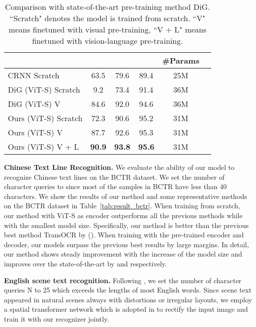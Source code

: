 \begin{table}[!t]
    \caption{Comparison with state-of-the-art pre-training method DiG. “Scratch"  denotes the model is trained from scratch. “V" means finetuned with visual pre-training, “V + L" means finetuned with vision-language pre-training.}
    \label{tab:eng_real}
    \setlength{\tabcolsep}{6pt}
    \centering
    \begin{tabular}{lccccc}
    \toprule
    & & & &\#Params \\
    \midrule
    CRNN Scratch &63.5 &79.6 &89.4 &25M \\ 
    \midrule
    DiG (ViT-S) Scratch  &9.2 &73.4 &91.4 &36M \\
    DiG (ViT-S) V &84.6 &92.0 &94.6 &36M \\
    \midrule
    Ours (ViT-S) Scratch  &72.3 &90.6 &95.2 &31M  \\
    Ours (ViT-S) V  &87.7 &92.6 &95.3 &31M  \\
    Ours (ViT-S) V + L  &\textbf{90.9} &\textbf{93.8} &\textbf{95.6} &31M  \\
    \bottomrule
    \end{tabular}
  \label{tab:tabe}
\end{table}


\vspace{2mm}
\noindent\textbf{Chinese Text Line Recognition.} We evaluate the ability of our model to recognize Chinese text lines on the BCTR dataset. We set the number of character queries  to  since most of the samples in BCTR have less than 40 characters. We show the results of our method and some representative methods on the BCTR dataset in Table~\ref{tab:result_bctr}. When training from scratch, our method with ViT-S as encoder outperforms all the previous methods while with the smallest model size. Specifically, our method is better than the previous best method TransOCR \cite{ChenLX21} by  (). When training with the pre-trained encoder and decoder, our models surpass the previous best results by large margins. In detail, our method shows steady improvement with the increase of the model size and improves over the state-of-the-art by  and  respectively.

\vspace{2mm}
\noindent\textbf{English scene text recognition.} Following \cite{shi2016end, shi2018aster}, we set the number of character queries N to 25 which exceeds the lengths of most English words. Since scene text appeared in natural scenes always with distortions or irregular layouts, we employ a spatial transformer network \cite{STN} which is adopted in \cite{shi2018aster} to rectify the input image and train it with our recognizer jointly. 



